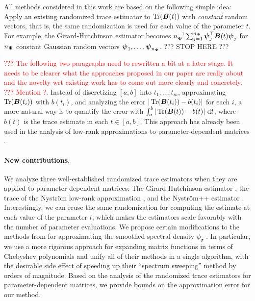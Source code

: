 All methods considered in this work are based on the following simple idea: Apply an existing randomized trace estimator to $\operatorname{Tr}(\boldsymbol{B}(t))$ with \emph{constant} random vectors, that is, the same randomization is used for each value of the parameter $t$. For example, the Girard-Hutchinson estimator becomes $n_{\boldsymbol{\Psi}}^{-1} \sum_{j=1}^{n_{\boldsymbol{\Psi}}} \boldsymbol{\psi}_j^{\top} \boldsymbol{B}(t) \boldsymbol{\psi}_j$ for $n_{\boldsymbol{\Psi}}$ constant Gaussian random vectors $\boldsymbol{\psi}_1, \dots, \boldsymbol{\psi}_{n_{\boldsymbol{\Psi}}}$.
??? STOP HERE ???


\textcolor{red}{??? The following two paragraphs need to rewritten a bit at a later stage. It needs to be clearer what the approaches proposed in our paper are really about and the novelty wrt existing work has to come out more clearly and concretely. ??? Mention \cite{park-2024-lowrank-approximation} ?.}
\color{black}
Instead of discretizing $[a, b]$ into $t_1, \ldots, t_m$, approximating $\operatorname{Tr}(\boldsymbol{B}(t_i))$ with $b(t_i)$, and analyzing the error $|\operatorname{Tr}(\boldsymbol{B}(t_i)) - b(t_i)|$ for each $i$, a more natural way is to quantify the error with $\int_{a}^{b} | \operatorname{Tr}(\boldsymbol{B}(t)) - b(t) |~\mathrm{d}t$, where $b(t)$ is the trace estimate in each $t \in [a, b]$. This approach has already been used in the analysis of low-rank approximations to parameter-dependent matrices \cite{kressner-2024-randomized-lowrank}.

\paragraph{New contributions.} We analyze three well-established randomized trace estimators when they are applied to parameter-dependent matrices: The Girard-Hutchinson estimator \cite{girard-1989-fast-montecarlo, hutchinson-1990-stochastic-estimator}, the trace of the Nyström low-rank approximation \cite{gittens-2013-revisiting-nystrom}, and the Nyström++ estimator \cite{persson-2022-improved-variants}. Interestingly, we can reuse the same randomization for computing the estimate at each value of the parameter $t$, which makes the estimators scale favorably with the number of parameter evaluations. We propose certain modifications to the methods from \cite{lin-2017-randomized-estimation} for approximating the smoothed spectral density $\phi_{\sigma}$ . In particular, we use a more rigorous approach for expanding matrix functions in terms of Chebyshev polynomials and unify all of their methods in a single algorithm, with the desirable side effect of speeding up their \enquote{spectrum sweeping} method by orders of magnitude. Based on the analysis of the randomized trace estimators for parameter-dependent matrices, we provide bounds on the approximation error for our method.


